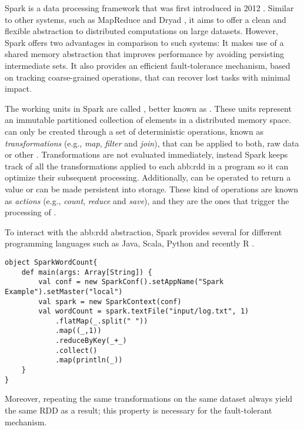 \label{sec:spark}


Spark is a data processing framework that was first introduced in 2012 \cite{Zaharia2012a}. Similar to other systems, such as MapReduce \cite{Dean2004} and Dryad \cite{Isard2007}, it aims to offer a clean and flexible abstraction to distributed computations on large datasets. However, Spark offers two advantages in comparison to such systems: It makes use of a shared memory abstraction that improves performance by avoiding persisting intermediate sets. It also provides an efficient fault-tolerance mechanism, based on tracking coarse-grained operations, that can recover lost tasks with minimal impact.

The working units in Spark are called \textit{}, better known as . These units represent an immutable partitioned collection of elements in a distributed memory space.  can only be created through a set of deterministic operations, known as \textit{transformations} (e.g., \textit{map}, \textit{filter} and \textit{join}), that can be applied to both, raw data or other . Transformations are not evaluated immediately, instead Spark keeps track of all the transformations applied to each \acrshort{abb:rdd} in a program so it can optimize their subsequent processing. Additionally,  can be operated to return a value or can be made persistent into storage. These kind of operations are known as \textit{actions} (e.g., \textit{count}, \textit{reduce} and \textit{save}), and they are the ones that trigger the processing of .

To interact with the \acrshort{abb:rdd} abstraction, Spark provides several  for different programming languages such as Java, Scala, Python and recently R \cite{Venkataraman2016}.

\lstset{language=Scala}
\begin{lstlisting}
object SparkWordCount{
	def main(args: Array[String]) {
		val conf = new SparkConf().setAppName("Spark Example").setMaster("local")
		val spark = new SparkContext(conf)
		val wordCount = spark.textFile("input/log.txt", 1)
			.flatMap(_.split(" "))
			.map((_,1))
			.reduceByKey(_+_)
			.collect()
			.map(println(_))    
	}
}
\end{lstlisting}	

Moreover, repeating the same transformations on the same dataset always yield the same RDD as a result; this property is necessary for the fault-tolerant mechanism.

